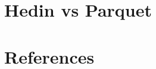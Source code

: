 \documentclass[aip,jcp,reprint,noshowkeys,superscriptaddress]{revtex4-2}
\begin{document}
\section{Hedin vs Parquet}
\fi
\section*{References}


\end{document}
